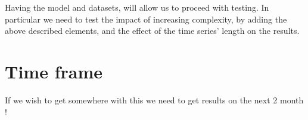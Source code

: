 \documentclass[10pt,a4paper]{article}
\begin{document}
Having the model and datasets, will allow us to proceed with testing. In particular we need to test the impact of increasing complexity, by adding the above described elements, and the effect of the time series' length on the results.

\section{Time frame}
If we wish to get somewhere with this we need to get results on the next 2 month !
\end{document}

